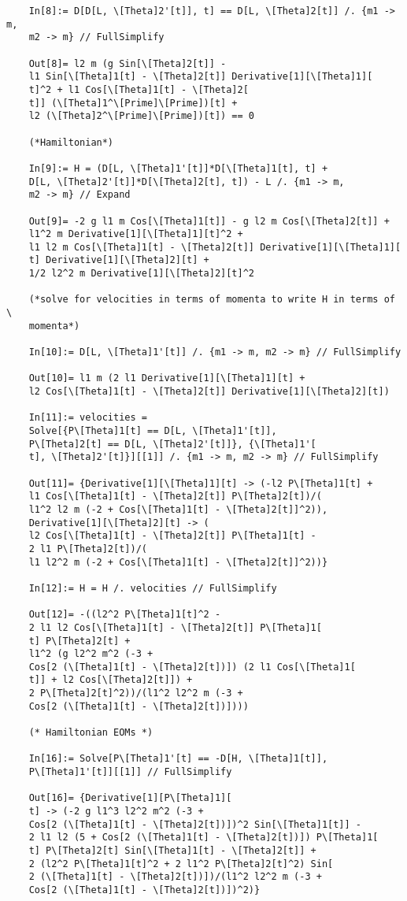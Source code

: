 \documentclass{article}
\theoremstyle{definition}
\begin{document}
\begin{enumerate}[label=(\alph*)]
\begin{lstlisting}
	In[8]:= D[D[L, \[Theta]2'[t]], t] == D[L, \[Theta]2[t]] /. {m1 -> m, 
	m2 -> m} // FullSimplify
	
	Out[8]= l2 m (g Sin[\[Theta]2[t]] - 
	l1 Sin[\[Theta]1[t] - \[Theta]2[t]] Derivative[1][\[Theta]1][
	t]^2 + l1 Cos[\[Theta]1[t] - \[Theta]2[
	t]] (\[Theta]1^\[Prime]\[Prime])[t] + 
	l2 (\[Theta]2^\[Prime]\[Prime])[t]) == 0
	
	(*Hamiltonian*)
	
	In[9]:= H = (D[L, \[Theta]1'[t]]*D[\[Theta]1[t], t] + 
	D[L, \[Theta]2'[t]]*D[\[Theta]2[t], t]) - L /. {m1 -> m, 
	m2 -> m} // Expand
	
	Out[9]= -2 g l1 m Cos[\[Theta]1[t]] - g l2 m Cos[\[Theta]2[t]] + 
	l1^2 m Derivative[1][\[Theta]1][t]^2 + 
	l1 l2 m Cos[\[Theta]1[t] - \[Theta]2[t]] Derivative[1][\[Theta]1][
	t] Derivative[1][\[Theta]2][t] + 
	1/2 l2^2 m Derivative[1][\[Theta]2][t]^2
	
	(*solve for velocities in terms of momenta to write H in terms of \
	momenta*)
	
	In[10]:= D[L, \[Theta]1'[t]] /. {m1 -> m, m2 -> m} // FullSimplify
	
	Out[10]= l1 m (2 l1 Derivative[1][\[Theta]1][t] + 
	l2 Cos[\[Theta]1[t] - \[Theta]2[t]] Derivative[1][\[Theta]2][t])
	
	In[11]:= velocities = 
	Solve[{P\[Theta]1[t] == D[L, \[Theta]1'[t]], 
	P\[Theta]2[t] == D[L, \[Theta]2'[t]]}, {\[Theta]1'[
	t], \[Theta]2'[t]}][[1]] /. {m1 -> m, m2 -> m} // FullSimplify
	
	Out[11]= {Derivative[1][\[Theta]1][t] -> (-l2 P\[Theta]1[t] + 
	l1 Cos[\[Theta]1[t] - \[Theta]2[t]] P\[Theta]2[t])/(
	l1^2 l2 m (-2 + Cos[\[Theta]1[t] - \[Theta]2[t]]^2)), 
	Derivative[1][\[Theta]2][t] -> (
	l2 Cos[\[Theta]1[t] - \[Theta]2[t]] P\[Theta]1[t] - 
	2 l1 P\[Theta]2[t])/(
	l1 l2^2 m (-2 + Cos[\[Theta]1[t] - \[Theta]2[t]]^2))}
	
	In[12]:= H = H /. velocities // FullSimplify
	
	Out[12]= -((l2^2 P\[Theta]1[t]^2 - 
	2 l1 l2 Cos[\[Theta]1[t] - \[Theta]2[t]] P\[Theta]1[
	t] P\[Theta]2[t] + 
	l1^2 (g l2^2 m^2 (-3 + 
	Cos[2 (\[Theta]1[t] - \[Theta]2[t])]) (2 l1 Cos[\[Theta]1[
	t]] + l2 Cos[\[Theta]2[t]]) + 
	2 P\[Theta]2[t]^2))/(l1^2 l2^2 m (-3 + 
	Cos[2 (\[Theta]1[t] - \[Theta]2[t])])))
	
	(* Hamiltonian EOMs *)
	
	In[16]:= Solve[P\[Theta]1'[t] == -D[H, \[Theta]1[t]], 
	P\[Theta]1'[t]][[1]] // FullSimplify
	
	Out[16]= {Derivative[1][P\[Theta]1][
	t] -> (-2 g l1^3 l2^2 m^2 (-3 + 
	Cos[2 (\[Theta]1[t] - \[Theta]2[t])])^2 Sin[\[Theta]1[t]] - 
	2 l1 l2 (5 + Cos[2 (\[Theta]1[t] - \[Theta]2[t])]) P\[Theta]1[
	t] P\[Theta]2[t] Sin[\[Theta]1[t] - \[Theta]2[t]] + 
	2 (l2^2 P\[Theta]1[t]^2 + 2 l1^2 P\[Theta]2[t]^2) Sin[
	2 (\[Theta]1[t] - \[Theta]2[t])])/(l1^2 l2^2 m (-3 + 
	Cos[2 (\[Theta]1[t] - \[Theta]2[t])])^2)}
	

\end{lstlisting}
\end{enumerate}
\end{document}
